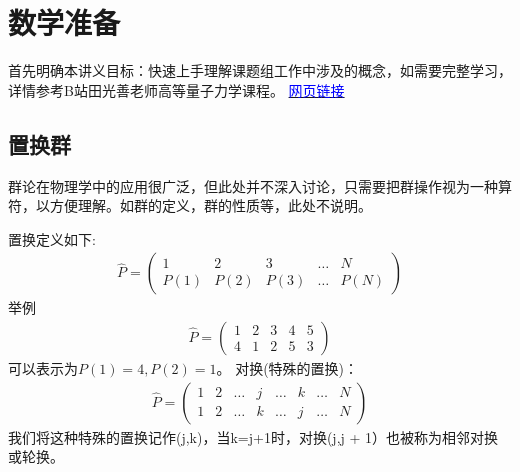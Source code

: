 \documentclass[12pt, a4paper, oneside, UTF8]{ctexbook}
\begin{document}
\section{数学准备}
首先明确本讲义目标：快速上手理解课题组工作中涉及的概念，如需要完整学习，详情参考B站田光善老师高等量子力学课程。
\href{https://www.bilibili.com/video/BV1qk4y1173i?p=1&vd_source=cd4587e54f9d57093a8dbe5712bb9c5e}
{\textcolor{blue}{网页链接}}

\subsection{置换群}
群论在物理学中的应用很广泛，但此处并不深入讨论，只需要把群操作视为一种算符，以方便理解。如群的定义，群的性质等，此处不说明。

置换定义如下:
\begin{align}
    \hat{P}=\left(\begin{matrix}
        1 & 2 & 3 & \dots & N\\
        P(1) & P(2) & P(3)&\dots&P(N)
    \end{matrix}\right)
\end{align}
举例
\begin{align}
    \hat{P}=\left(\begin{matrix}
        1&2&3&4&5\\
        4&1&2&5&3
    \end{matrix}\right)
\end{align}
可以表示为$P(1)=4,P(2)=1$。
对换(特殊的置换)：
\begin{align}
    \hat{P}=\left(\begin{matrix}
        1&2&\dots&j&\dots&k&\dots&N\\
        1&2&\dots&k&\dots&j&\dots&N
    \end{matrix}\right)
\end{align}
我们将这种特殊的置换记作(j,k)，当k=j+1时，对换(j,j + 1）也被称为相邻对换或轮换。
\end{document}
